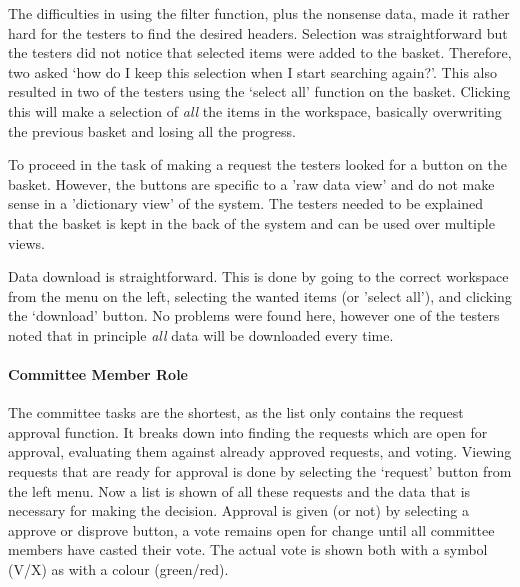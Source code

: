 The difficulties in using the filter function, plus the nonsense data, made it rather hard for the testers to find the desired headers. 
Selection was straightforward but the testers did not notice that selected items were added to the basket. 
Therefore, two asked `how do I keep this selection when I start searching again?'.
This also resulted in two of the testers using the `select all' function on the basket. 
Clicking this will make a selection of \emph{all} the items in the workspace, basically overwriting the previous basket and losing all the progress.

To proceed in the task of making a request the testers looked for a button on the basket.
However, the buttons are specific to a 'raw data view' and do not make sense in a 'dictionary view' of the system.
The testers needed to be explained that the basket is kept in the back of the system and can be used over multiple views.

Data download is straightforward. This is done by going to the correct workspace from the menu on the left, selecting the wanted items (or 'select all'), and clicking the `download' button.
No problems were found here, however one of the testers noted that in principle \emph{all} data will be downloaded every time. 

\paragraph{Committee Member Role}
The committee tasks are the shortest, as the list only contains the request approval function. 
It breaks down into finding the requests which are open for approval, evaluating them against already approved requests, and voting.
Viewing requests that are ready for approval is done by selecting the `request' button from the left menu.
Now a list is shown of all these requests and the data that is necessary for making the decision.
Approval is given (or not) by selecting a approve or disprove button, a vote remains open for change until all committee members have casted their vote.
The actual vote is shown both with a symbol (V/X) as with a colour (green/red).

